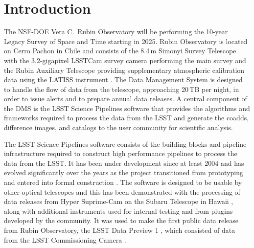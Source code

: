 \section{Introduction}
\label{sec:intro}

The NSF-DOE Vera C.\ Rubin Observatory will be performing the 10-year Legacy Survey of Space and Time \citep[LSST;][]{2019ApJ...873..111I} starting in 2025.
Rubin Observatory is located on Cerro Pachon in Chile and consists of the 8.4\,m Simonyi Survey Telescope \citep{2022SPIE12182E..0WT} with the 3.2-gigapixel LSSTCam survey camera \citep{10.71929/rubin/2571927,2024SPIE13096E..1SR} performing the main survey and the Rubin Auxiliary Telescope \citep{2020SPIE11452E..0UI} providing supplementary atmospheric calibration data using the LATISS instrument \citep{10.71929/rubin/2571930}.
The Data Management System \citep[DMS;][]{2022arXiv221113611O} is designed to handle the flow of data from the telescope, approaching 20\,TB per night, in order to issue alerts and to prepare annual data releases.
A central component of the DMS is the LSST Science Pipelines software that provides the algorithms and frameworks required to process the data from the LSST and generate the coadds, difference images, and catalogs to the user community for scientific analysis.

The LSST Science Pipelines software consists of the building blocks and pipeline infrastructure required to construct high performance pipelines to process the data from the LSST.
It has been under development since at least 2004 \citep{2004AAS...20510811A} and has evolved significantly over the years as the project transitioned from prototyping \citep{2010SPIE.7740E..15A} and entered into formal construction \citep{2017ASPC..512..279J}.
The software is designed to be usable by other optical telescopes and this has been demonstrated with the processing of data releases from Hyper Suprime-Cam on the Subaru Telescope in Hawaii \citep{2022PASJ...74..247A}, along with additional instruments used for internal testing and from plugins developed by the community.
It was used to make the first public data release from Rubin Observatory, the LSST Data Preview 1 \citep{RTN-095,10.71929/rubin/2570308}, which consisted of data from the LSST Commissioning Camera \citep[LSSTComCam;][]{10.71929/rubin/2561361,2022SPIE12184E..0JS}.

